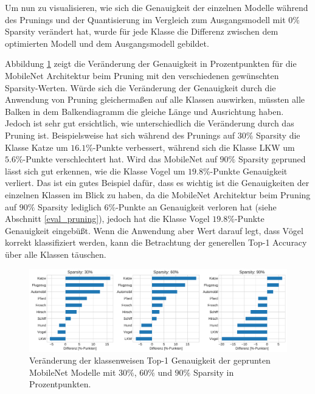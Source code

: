 Um nun zu visualisieren, wie sich die Genauigkeit der einzelnen Modelle während des Prunings und der Quantisierung im Vergleich zum Ausgangsmodell mit $0\%$ Sparsity verändert hat, wurde für jede Klasse die Differenz zwischen dem optimierten Modell und dem Ausgangsmodell gebildet.

Abbildung \ref{f4.6} zeigt die Veränderung der Genauigkeit in Prozentpunkten für die MobileNet Architektur beim Pruning mit den verschiedenen gewünschten Sparsity-Werten. Würde sich die Veränderung der Genauigkeit durch die Anwendung von Pruning gleichermaßen auf alle Klassen auswirken, müssten alle Balken in dem Balkendiagramm die gleiche Länge und Ausrichtung haben. Jedoch ist sehr gut ersichtlich, wie unterschiedlich die Veränderung durch das Pruning ist. Beispielsweise hat sich während des Prunings auf $30\%$ Sparsity die Klasse Katze um $16.1\%$-Punkte verbessert, während sich die Klasse LKW um $5.6\%$-Punkte verschlechtert hat. Wird das MobileNet auf $90\%$ Sparsity gepruned lässt sich gut erkennen, wie die Klasse Vogel um $19.8\%$-Punkte Genauigkeit verliert. Das ist ein gutes Beispiel dafür, dass es wichtig ist die Genauigkeiten der einzelnen Klassen im Blick zu haben, da die MobileNet Architektur beim Pruning auf $90\%$ Sparsity lediglich $6\%$-Punkte an Genauigkeit verloren hat (siehe Abschnitt \ref{eval_pruning}), jedoch hat die Klasse Vogel $19.8\%$-Punkte Genauigkeit eingebüßt. Wenn die Anwendung aber Wert darauf legt, dass Vögel korrekt klassifiziert werden, kann die Betrachtung der generellen Top-1 Accuracy über alle Klassen täuschen.

\begin{figure}[htbp]
\centerline{\includegraphics[width=\textwidth]{content/images/classwise_acc_change_pruning_mobilenet.pdf}}
\caption{Veränderung der klassenweisen Top-1 Genauigkeit der geprunten MobileNet Modelle mit $30\%$, $60\%$ und $90\%$ Sparsity in Prozentpunkten.}
\label{f4.6}
\end{figure}

